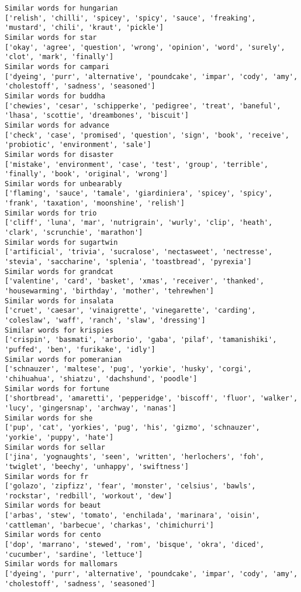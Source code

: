 \documentclass[11pt]{article}
\begin{document}
\begin{Verbatim}[commandchars=\\\{\}]
Similar words for hungarian
['relish', 'chilli', 'spicey', 'spicy', 'sauce', 'freaking', 'mustard', 'chili', 'kraut', 'pickle']
Similar words for star
['okay', 'agree', 'question', 'wrong', 'opinion', 'word', 'surely', 'clot', 'mark', 'finally']
Similar words for campari
['dyeing', 'purr', 'alternative', 'poundcake', 'impar', 'cody', 'amy', 'cholestoff', 'sadness', 'seasoned']
Similar words for buddha
['chewies', 'cesar', 'schipperke', 'pedigree', 'treat', 'baneful', 'lhasa', 'scottie', 'dreambones', 'biscuit']
Similar words for advance
['check', 'case', 'promised', 'question', 'sign', 'book', 'receive', 'probiotic', 'environment', 'sale']
Similar words for disaster
['mistake', 'environment', 'case', 'test', 'group', 'terrible', 'finally', 'book', 'original', 'wrong']
Similar words for unbearably
['flaming', 'sauce', 'tamale', 'giardiniera', 'spicey', 'spicy', 'frank', 'taxation', 'moonshine', 'relish']
Similar words for trio
['cliff', 'luna', 'mar', 'nutrigrain', 'wurly', 'clip', 'heath', 'clark', 'scrunchie', 'marathon']
Similar words for sugartwin
['artificial', 'trivia', 'sucralose', 'nectasweet', 'nectresse', 'stevia', 'saccharine', 'splenia', 'toastbread', 'pyrexia']
Similar words for grandcat
['valentine', 'card', 'basket', 'xmas', 'receiver', 'thanked', 'housewarming', 'birthday', 'mother', 'tehrewhen']
Similar words for insalata
['cruet', 'caesar', 'vinaigrette', 'vinegarette', 'carding', 'coleslaw', 'waff', 'ranch', 'slaw', 'dressing']
Similar words for krispies
['crispin', 'basmati', 'arborio', 'gaba', 'pilaf', 'tamanishiki', 'puffed', 'ben', 'furikake', 'idly']
Similar words for pomeranian
['schnauzer', 'maltese', 'pug', 'yorkie', 'husky', 'corgi', 'chihuahua', 'shiatzu', 'dachshund', 'poodle']
Similar words for fortune
['shortbread', 'amaretti', 'pepperidge', 'biscoff', 'fluor', 'walker', 'lucy', 'gingersnap', 'archway', 'nanas']
Similar words for she
['pup', 'cat', 'yorkies', 'pug', 'his', 'gizmo', 'schnauzer', 'yorkie', 'puppy', 'hate']
Similar words for sellar
['jina', 'yognaughts', 'seen', 'written', 'herlochers', 'foh', 'twiglet', 'beechy', 'unhappy', 'swiftness']
Similar words for fr
['golazo', 'zipfizz', 'fear', 'monster', 'celsius', 'bawls', 'rockstar', 'redbill', 'workout', 'dew']
Similar words for beaut
['arbas', 'stew', 'tomato', 'enchilada', 'marinara', 'oisin', 'cattleman', 'barbecue', 'charkas', 'chimichurri']
Similar words for cento
['dop', 'marrano', 'stewed', 'rom', 'bisque', 'okra', 'diced', 'cucumber', 'sardine', 'lettuce']
Similar words for mallomars
['dyeing', 'purr', 'alternative', 'poundcake', 'impar', 'cody', 'amy', 'cholestoff', 'sadness', 'seasoned']

\end{Verbatim}
\end{document}
